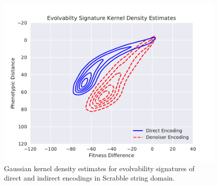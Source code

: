 \begin{figure}
  \includegraphics[width=\linewidth]{img/scrabble_es_kde}
  \caption{Gaussian kernel density estimates for evolvability signatures of direct and indirect encodings in Scrabble string domain.}
  \label{fig:scrabble_es_kde}
\end{figure}
